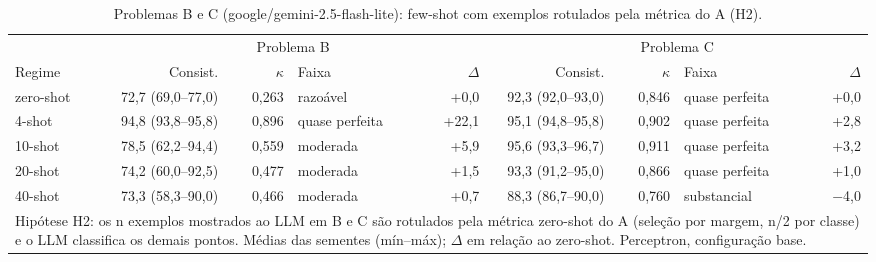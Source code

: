 \begin{table}[htbp]
\centering
\small
\caption{Problemas B e C (google/gemini-2.5-flash-lite): few-shot com exemplos rotulados pela métrica do A (H2).}
\label{tab:bloco1_BC_fewshot_exemplos_da_metrica_flashlite}
\begin{tabular}{lrrlrrrlr}
\toprule
 & \multicolumn{4}{c}{Problema B} & \multicolumn{4}{c}{Problema C} \\ \cmidrule(lr){2-5} \cmidrule(lr){6-9}
Regime & Consist. & $\kappa$ & Faixa & $\Delta$ & Consist. & $\kappa$ & Faixa & $\Delta$ \\
\midrule
zero-shot & 72,7 (69,0–77,0) & 0,263 & razoável & +0,0 & 92,3 (92,0–93,0) & 0,846 & quase perfeita & +0,0 \\
4-shot & 94,8 (93,8–95,8) & 0,896 & quase perfeita & +22,1 & 95,1 (94,8–95,8) & 0,902 & quase perfeita & +2,8 \\
10-shot & 78,5 (62,2–94,4) & 0,559 & moderada & +5,9 & 95,6 (93,3–96,7) & 0,911 & quase perfeita & +3,2 \\
20-shot & 74,2 (60,0–92,5) & 0,477 & moderada & +1,5 & 93,3 (91,2–95,0) & 0,866 & quase perfeita & +1,0 \\
40-shot & 73,3 (58,3–90,0) & 0,466 & moderada & +0,7 & 88,3 (86,7–90,0) & 0,760 & substancial & $-$4,0 \\
\bottomrule
\multicolumn{9}{p{0.95\linewidth}}{\footnotesize Hipótese H2: os n exemplos mostrados ao LLM em B e C são rotulados pela métrica zero-shot do A (seleção por margem, n/2 por classe) e o LLM classifica os demais pontos. Médias das sementes (mín–máx); $\Delta$ em relação ao zero-shot. Perceptron, configuração base.} \\
\end{tabular}
\end{table}
